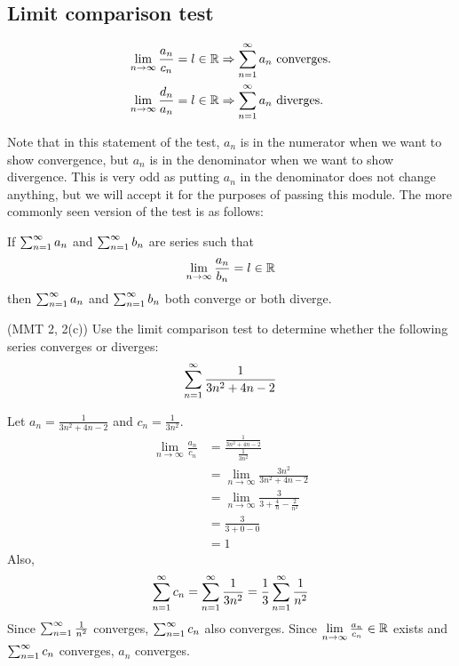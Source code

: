 
\subsection{Limit comparison test}
\begin{test}
  \begin{align*}
    \lim_{n \to \infty} \frac{a_n}{c_n} = l \in \R &\implies \sumto{n}{\infty} a_n \text{ converges}. \\ 
    \lim_{n \to \infty} \frac{d_n}{a_n} = l \in \R &\implies \sumto{n}{\infty} a_n \text{ diverges}.
  \end{align*}
\end{test}
Note that in this statement of the test, $a_n$ is in the numerator when we want to show convergence, but $a_n$ is in the denominator when we want to show divergence. This is very odd as putting $a_n$ in the denominator does not change anything, but we will accept it for the purposes of passing this module. The more commonly seen version of the test is as follows:
\begin{test}
  If $\sum_{n = 1} ^ \infty a_n$ and $\sum_{n = 1} ^ \infty b_n$ are series such that
  \[
    \lim_{n \to \infty} \frac{a_n}{b_n} = l \in \R
  \]
  then $\sum_{n = 1} ^ \infty a_n$ and $\sum_{n = 1} ^ \infty b_n$ both converge or both diverge.
\end{test}
\begin{eg}
  (MMT 2, 2(c)) Use the limit comparison test to determine whether the following series converges or diverges:
  \[
    \sum_{n = 1} ^ \infty \frac{1}{3n ^ 2 + 4n - 2}
  \]
\end{eg}
\begin{solution}
  Let $a_n = \frac{1}{3n^2 + 4n - 2}$ and $c_n = \frac{1}{3n ^ 2}$.
  \begin{align*}
    \lim_{n \to \infty} \frac{a_n}{c_n} &= \frac{\frac{1}{3n ^ 2 + 4n - 2}}{\frac{1}{3n ^ 2}} \\
    &= \lim_{n \to \infty} \frac{3n ^ 2}{3n ^ 2 + 4n - 2} \\
    &= \lim_{n \to \infty} \frac{3}{3 + \frac{4}{n} - \frac{2}{n ^ 2}} \\
    &= \frac{3}{3 + 0 - 0} \\
    &= 1
  \end{align*}
  Also,
  \[
    \sum_{n = 1} ^ \infty c_n = \sum_{n = 1} ^ \infty \frac{1}{3n ^ 2} = \frac{1}{3} \sum_{n = 1} ^ \infty \frac{1}{n ^ 2}
  \]
  Since $\sum_{n = 1} ^ \infty \frac{1}{n ^ 2}$ converges, $\sum_{n = 1} ^ \infty c_n$ also converges. Since $\lim_{n \to \infty} \frac{a_n}{c_n} \in \R$ exists and $\sum_{n = 1} ^ \infty c_n$ converges, $a_n$ converges.
\end{solution}

